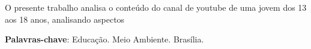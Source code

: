 
\setlength{\absparsep}{18pt} %
\begin{resumo}
 O presente trabalho analisa o conteúdo do canal de youtube de uma jovem dos 13 aos 18 anos, analisando aspectos

 \textbf{Palavras-chave}: Educação. Meio Ambiente. Brasília.
\end{resumo}

